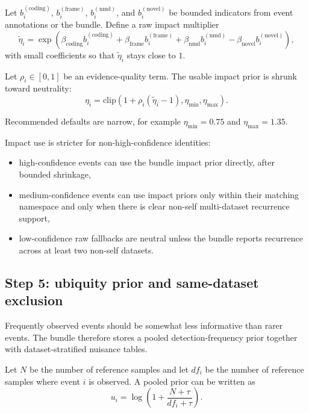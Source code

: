 \documentclass[11pt]{article}
\begin{document}
Let $b_i^{(\mathrm{coding})}$, $b_i^{(\mathrm{frame})}$, $b_i^{(\mathrm{nmd})}$, and $b_i^{(\mathrm{novel})}$ be bounded indicators from event annotations or the bundle. Define a raw impact multiplier
\begin{equation}
\widetilde{\eta}_i =
\exp\!\left(
\beta_{\mathrm{coding}} b_i^{(\mathrm{coding})}
+ \beta_{\mathrm{frame}} b_i^{(\mathrm{frame})}
+ \beta_{\mathrm{nmd}} b_i^{(\mathrm{nmd})}
- \beta_{\mathrm{novel}} b_i^{(\mathrm{novel})}
\right),
\label{eq:impact_raw}
\end{equation}
with small coefficients so that $\widetilde{\eta}_i$ stays close to $1$.

Let $\rho_i \in [0,1]$ be an evidence-quality term. The usable impact prior is shrunk toward neutrality:
\begin{equation}
\eta_i = \mathrm{clip}\!\left(1 + \rho_i(\widetilde{\eta}_i - 1), \eta_{\min}, \eta_{\max}\right).
\label{eq:impact_shrunk}
\end{equation}

Recommended defaults are narrow, for example $\eta_{\min}=0.75$ and $\eta_{\max}=1.35$.

Impact use is stricter for non-high-confidence identities:
\begin{itemize}[leftmargin=2em]
\item high-confidence events can use the bundle impact prior directly, after bounded shrinkage,
\item medium-confidence events can use impact priors only within their matching namespace and only when there is clear non-self multi-dataset recurrence support,
\item low-confidence raw fallbacks are neutral unless the bundle reports recurrence across at least two non-self datasets.
\end{itemize}

\subsection{Step 5: ubiquity prior and same-dataset exclusion}
Frequently observed events should be somewhat less informative than rarer events. The bundle therefore stores a pooled detection-frequency prior together with dataset-stratified nuisance tables.

Let $N$ be the number of reference samples and let $df_i$ be the number of reference samples where event $i$ is observed. A pooled prior can be written as
\begin{equation}
u_i = \log\!\left(1 + \frac{N+\tau}{df_i+\tau}\right).
\label{eq:idf}
\end{equation}
\end{document}
